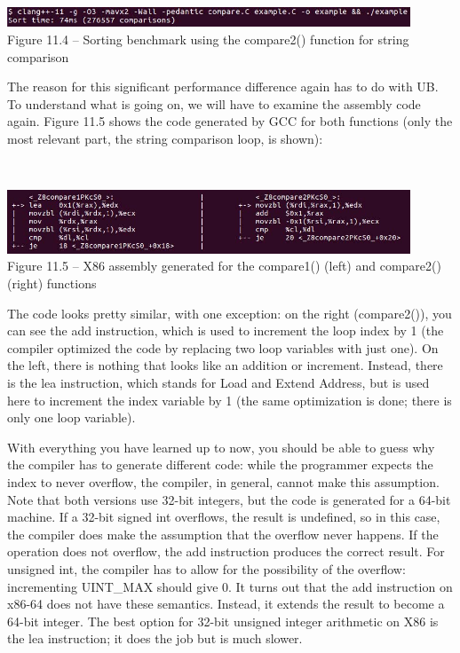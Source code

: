 \hspace*{\fill} \\ %
\begin{center}
\includegraphics[width=0.9\textwidth]{content/3/chapter11/images/4.jpg}\\
Figure 11.4 – Sorting benchmark using the compare2() function for string comparison
\end{center}

The reason for this significant performance difference again has to do with UB. To understand what is going on, we will have to examine the assembly code again. Figure 11.5 shows the code generated by GCC for both functions (only the most relevant part, the string comparison loop, is shown):

\hspace*{\fill} \\ %
\begin{center}
\includegraphics[width=0.9\textwidth]{content/3/chapter11/images/5.jpg}\\
Figure 11.5 – X86 assembly generated for the compare1() (left) and compare2() (right) functions
\end{center}

The code looks pretty similar, with one exception: on the right (compare2()), you can see the add instruction, which is used to increment the loop index by 1 (the compiler optimized the code by replacing two loop variables with just one). On the left, there is nothing that looks like an addition or increment. Instead, there is the lea instruction, which stands for Load and Extend Address, but is used here to increment the index variable by 1 (the same optimization is done; there is only one loop variable). 

With everything you have learned up to now, you should be able to guess why the compiler has to generate different code: while the programmer expects the index to never overflow, the compiler, in general, cannot make this assumption. Note that both versions use 32-bit integers, but the code is generated for a 64-bit machine. If a 32-bit signed int overflows, the result is undefined, so in this case, the compiler does make the assumption that the overflow never happens. If the operation does not overflow, the add instruction produces the correct result. For unsigned int, the compiler has to allow for the possibility of the overflow: incrementing UINT\_MAX should give 0. It turns out that the add instruction on x86-64 does not have these semantics. Instead, it extends the result to become a 64-bit integer. The best option for 32-bit unsigned integer arithmetic on X86 is the lea instruction; it does the job but is much slower.

